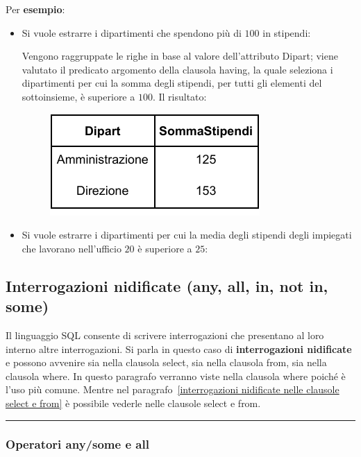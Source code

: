 \documentclass[a4paper]{article}
\newcommand{\longline}{\noindent\rule{\textwidth}{0.4pt}}
\begin{document}
	\noindent
	Per \textcolor{Green4}{\textbf{esempio}}:
	\begin{itemize}
		\item Si vuole estrarre i dipartimenti che spendono più di $100$ in stipendi:
		
		Vengono raggruppate le righe in base al valore dell'attributo \textsf{Dipart}; viene valutato il predicato argomento della clausola \textsf{having}, la quale seleziona i dipartimenti per cui la somma degli stipendi, per tutti gli elementi del sottoinsieme, è superiore a $100$. Il risultato:
		\begin{figure}[!htp]
			\centering
			\includegraphics[width=.3\textwidth]{img/having-ex1.pdf}
		\end{figure}
		
		\item Si vuole estrarre i dipartimenti per cui la media degli stipendi degli impiegati che lavorano nell'ufficio $20$ è superiore a $25$:
		
	\end{itemize}\newpage

	\subsection{Interrogazioni nidificate (\textsf{any}, \textsf{all}, \textsf{in}, \textsf{not in}, \textsf{some})}
	
	Il linguaggio SQL consente di scrivere interrogazioni che presentano al loro interno altre interrogazioni. Si parla in questo caso di \textcolor{Red3}{\textbf{interrogazioni nidificate}} e possono avvenire sia nella clausola \textsf{select}, sia nella clausola \textsf{from}, sia nella clausola \textsf{where}. In questo paragrafo verranno viste nella clausola \textsf{where} poiché è l'uso più comune. Mentre nel paragrafo~\ref{interrogazioni nidificate nelle clausole select e from} è possibile vederle nelle clausole \textsf{select} e \textsf{from}.
	
	\longline
	
	\subsubsection{Operatori \textsf{any}/\textsf{some} e \textsf{all}}
	
\end{document}
